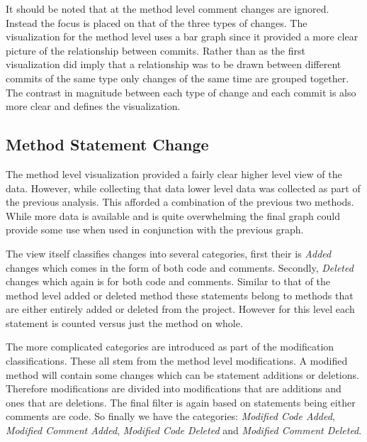 It should be noted that at the method level comment changes are ignored. Instead the focus is placed on that of the three types of changes. The visualization for the method level uses a bar graph since it provided a more clear picture of the relationship between commits. Rather than as the first visualization did imply that a relationship was to be drawn between different commits of the same type only changes of the same time are grouped together. The contrast in magnitude between each type of change and each commit is also more clear and defines the visualization.

\subsection{Method Statement Change}

The method level visualization provided a fairly clear higher level view of the data. However, while collecting that data lower level data was collected as part of the previous analysis. This afforded a combination of the previous two methods. While more data is available and is quite overwhelming the final graph could provide some use when used in conjunction with the previous graph.

The view itself classifies changes into several categories, first their is \textit{Added} changes which comes in the form of both code and comments. Secondly, \textit{Deleted} changes which again is for both code and comments. Similar to that of the method level added or deleted method these statements belong to methods that are either entirely added or deleted from the project. However for this level each statement is counted versus just the method on whole.

The more complicated categories are introduced as part of the modification classifications. These all stem from the method level modifications. A modified method will contain some changes which can be statement additions or deletions. Therefore modifications are divided into modifications that are additions and ones that are deletions. The final filter is again based on statements being either comments are code. So finally we have the categories: \textit{Modified Code Added}, \textit{Modified Comment Added}, \textit{Modified Code Deleted} and \textit{Modified Comment Deleted}.

